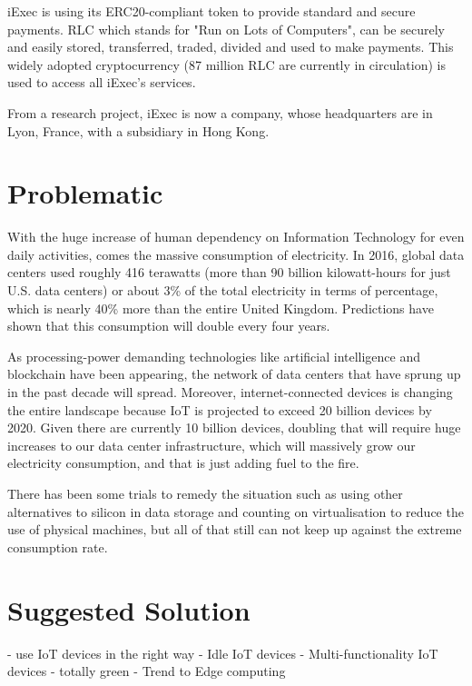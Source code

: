  iExec is using its ERC20-compliant token to provide standard and secure payments. RLC\cite{RLC} which stands for
  "Run on Lots of Computers", can be securely and easily stored, transferred, traded, divided and used
  to make payments. This widely adopted cryptocurrency (87 million RLC are currently in circulation)
  is used to access all iExec's services.

  From a research project, iExec is now a company, whose headquarters are in Lyon, France, with a
  subsidiary in Hong Kong.

\section{Problematic}
  With the huge increase of human dependency on Information Technology for even daily activities,
  comes the massive consumption of electricity. In 2016, global data centers used roughly 416
  terawatts (more than 90 billion kilowatt-hours for just U.S. data centers) or about 3\% of the
  total electricity in terms of percentage, which is nearly 40\% more than the entire United Kingdom.
  Predictions have shown that this consumption will double every four years\cite{consumption-prediction}.

  As processing-power demanding technologies like artificial intelligence and blockchain have
  been appearing, the network of data centers that have sprung up in the past decade will spread.
  Moreover, internet-connected devices is changing the entire landscape because IoT is
  projected to exceed 20 billion devices by 2020. Given there are currently 10 billion devices,
  doubling that will require huge increases to our data center infrastructure, which will
  massively grow our electricity consumption, and that is just adding fuel to the fire.

  There has been some trials to remedy the situation such as using other alternatives to silicon in
  data storage and counting on virtualisation to reduce the use of physical machines, but all of that
  still can not keep up against the extreme consumption rate.

\section{Suggested Solution}
  - use IoT devices in the right way - Idle IoT devices 
  - Multi-functionality IoT devices
  - totally green
  - Trend to Edge computing

  


\clearpage